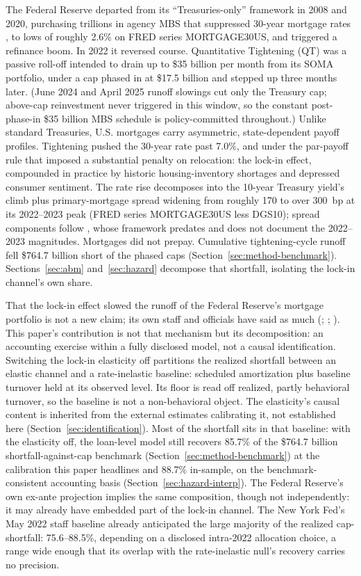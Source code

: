 \documentclass[12pt]{article}
\begin{document}
The Federal Reserve departed from its ``Treasuries-only'' framework in 2008 and 2020, purchasing trillions in agency MBS that suppressed 30-year mortgage rates \citep{hancock2011}, to lows of roughly 2.6\% on FRED series MORTGAGE30US, and triggered a refinance boom. In 2022 it reversed course. Quantitative Tightening (QT) was a passive roll-off intended to drain up to \$35 billion per month from its SOMA portfolio, under a cap phased in at \$17.5 billion and stepped up three months later. (June 2024 and April 2025 runoff slowings cut only the Treasury cap; above-cap reinvestment never triggered in this window, so the constant post-phase-in \$35 billion MBS schedule is policy-committed throughout.) Unlike standard Treasuries, U.S. mortgages carry asymmetric, state-dependent payoff profiles. Tightening pushed the 30-year rate past 7.0\%, and under the par-payoff rule that imposed a substantial penalty on relocation: the lock-in effect, compounded in practice by historic housing-inventory shortages and depressed consumer sentiment. The rate rise decomposes into the 10-year Treasury yield's climb plus primary-mortgage spread widening from roughly 170 to over 300~bp at its 2022--2023 peak (FRED series MORTGAGE30US less DGS10); spread components follow \citet{boyarchenko2019}, whose framework predates and does not document the 2022--2023 magnitudes. Mortgages did not prepay. Cumulative tightening-cycle runoff fell \$764.7 billion short of the phased caps \citep[on the balance-sheet setting, see][]{lopezsalido2023,acharya2023} (Section~\ref{sec:method-benchmark}). Sections~\ref{sec:abm} and~\ref{sec:hazard} decompose that shortfall, isolating the lock-in channel's own share.

That the lock-in effect slowed the runoff of the Federal Reserve's mortgage portfolio is not a new claim; its own staff and officials have said as much (\citealp{na2024}; \citealp{perli2024}; \citealp{hammack2025}). This paper's contribution is not that mechanism but its decomposition: an accounting exercise within a fully disclosed model, not a causal identification. Switching the lock-in elasticity off partitions the realized shortfall between an elastic channel and a rate-inelastic baseline: scheduled amortization plus baseline turnover held at its observed level. Its floor is read off realized, partly behavioral turnover, so the baseline is not a non-behavioral object. The elasticity's causal content is inherited from the external estimates calibrating it, not established here (Section~\ref{sec:identification}). Most of the shortfall sits in that baseline: with the elasticity off, the loan-level model still recovers 85.7\% of the \$764.7 billion shortfall-against-cap benchmark (Section~\ref{sec:method-benchmark}) at the calibration this paper headlines and 88.7\% in-sample, on the benchmark-consistent accounting basis (Section~\ref{sec:hazard-interp}). The Federal Reserve's own ex-ante projection implies the same composition, though not independently: it may already have embedded part of the lock-in channel. The New York Fed's May 2022 staff baseline already anticipated the large majority of the realized cap-shortfall: 75.6--88.5\%, depending on a disclosed intra-2022 allocation choice, a range wide enough that its overlap with the rate-inelastic null's recovery carries no precision.
\end{document}
